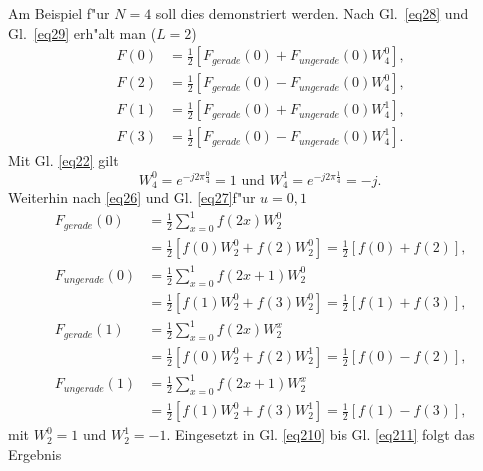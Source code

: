 Am  Beispiel f"ur  $N=4$ soll dies demonstriert werden. Nach  Gl.~\ref{eq28}
und Gl.~\ref{eq29} erh"alt man ($L=2$)
\begin{align}
\label{eq210}
F(0) &= \frac{1}{2} \left [ F_{gerade}(0) + F_{ungerade}(0) W_{4}^{0} \right ]
\textrm{,} \\
F(2) &= \frac{1}{2} \left [ F_{gerade}(0) - F_{ungerade}(0) W_{4}^{0} \right ]
\textrm{,} \\
F(1) &= \frac{1}{2} \left [ F_{gerade}(0) + F_{ungerade}(0) W_{4}^{1} \right ]
\textrm{,} \\
F(3) &= \frac{1}{2} \left [ F_{gerade}(0) - F_{ungerade}(0) W_{4}^{1} \right ]
\label{eq211}
\textrm{.}
\end{align}
Mit Gl. \ref{eq22} gilt
\begin{equation}
  W_{4}^{0} = e^{ -j 2 \pi \frac{0}{4} } = 1
\textrm{ und }
  W_{4}^{1} = e^{ -j 2 \pi \frac{1}{4} } = -j
\textrm{.}
\end{equation}
Weiterhin nach \ref{eq26} und Gl. \ref{eq27}f"ur $u=0,1$
\begin{align}
F_{gerade}(0) &= \frac{1}{2} \sum \limits_{x=0}^{1}f(2x) W_{2}^{0}  \nonumber \\
  &= \frac{1}{2} \left [ f(0)W_{2}^{0} + f(2)W_{2}^{0} \right ]
  = \frac{1}{2} \left [ f(0) + f(2) \right ]
\textrm{,}\\
F_{ungerade}(0) &= \frac{1}{2} \sum \limits_{x=0}^{1}f(2x+1) W_{2}^{0} \nonumber \\
  &= \frac{1}{2} \left [ f(1)W_{2}^{0} + f(3)W_{2}^{0} \right ]
  = \frac{1}{2} \left [ f(1) + f(3) \right ]
\textrm{,}\\
F_{gerade}(1) &= \frac{1}{2} \sum \limits_{x=0}^{1}f(2x) W_{2}^{x} \nonumber \\
  &= \frac{1}{2} \left [ f(0)W_{2}^{0} + f(2)W_{2}^{1} \right ]
  = \frac{1}{2} \left [ f(0) - f(2) \right ]
\textrm{,}\\
F_{ungerade}(1) &= \frac{1}{2} \sum \limits_{x=0}^{1}f(2x+1) W_{2}^{x} \nonumber \\
  &= \frac{1}{2} \left [ f(1)W_{2}^{0} + f(3)W_{2}^{1} \right ]
  = \frac{1}{2} \left [ f(1) - f(3) \right ]
\textrm{,}
\end{align}
mit $W_{2}^{0} = 1$  und  $W_{2}^{1} = -1$.
Eingesetzt in Gl. \ref{eq210} bis Gl. \ref{eq211} folgt  das Ergebnis
